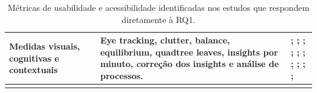 \begin{longtable}{|p{3.2cm}|p{6cm}|p{5.8cm}|}
Medidas visuais, cognitivas e contextuais &
Eye tracking, clutter, balance, equilibrium, quadtree leaves, insights por minuto, correção dos insights e análise de processos. &
\cite{romano2013age}; \cite{sadeghi2020hci}; \cite{yalcin2018keshif}; \cite{ko2019old}; \cite{vaughan2006why}; \cite{crabb2014age}; \cite{sharit2008information}; \cite{kanjanakuha2019comprehensibility}; \cite{gautam2019adding}; \cite{christel2005addressing}; \cite{ueki2025ucker} \\ \hline
\caption{Métricas de usabilidade e acessibilidade identificadas nos estudos que respondem diretamente à RQ1.}
\label{tab:metricasRQ1}
\end{longtable}